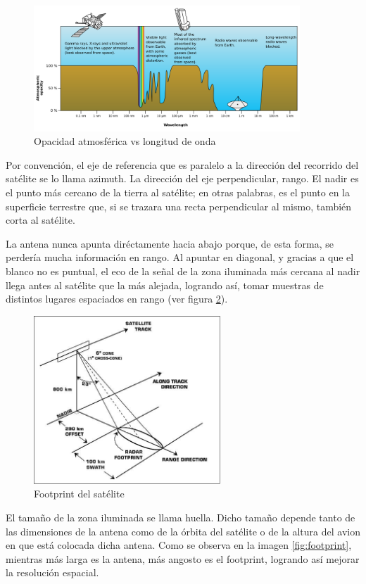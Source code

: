 \begin{figure}[H]
 \centering
 \includegraphics[width=10cm]{gfx/AtmosphericOpacity.png}
 \caption{Opacidad atmosférica vs longitud de onda \cite{electromagneticOpacity}}
 \label{fig:atmosphere}
\end{figure}

Por convención, el eje de referencia que es paralelo a la dirección del recorrido del satélite se lo llama azimuth. La
dirección del eje perpendicular, rango. El nadir es el punto más cercano de la tierra al satélite; en otras palabras,
es el punto en la superficie terrestre que, si se trazara una recta perpendicular al mismo, también corta al satélite.

La antena nunca apunta diréctamente hacia abajo porque, de esta forma, se perdería mucha información en rango. Al apuntar
en diagonal, y gracias a que el blanco no es puntual, el eco de la señal de la zona iluminada más cercana al nadir llega
antes al satélite que la más alejada, logrando así, tomar muestras de distintos lugares espaciados en rango (ver figura
\ref{fig:antena_ilumination}).

\begin{figure}[H]
 \centering
 \includegraphics[width=7cm]{gfx/satellite.png}
 \caption{Footprint del satélite}
 \label{fig:antena_ilumination}
\end{figure}

El tamaño de la zona iluminada se llama huella. Dicho tamaño depende tanto de las dimensiones de la antena como de la
órbita del satélite o de la altura del avion en que está colocada dicha antena. Como se observa en la imagen
\ref{fig:footprint}, mientras más larga es la antena, más angosto es el footprint, logrando así mejorar la resolución
espacial.

